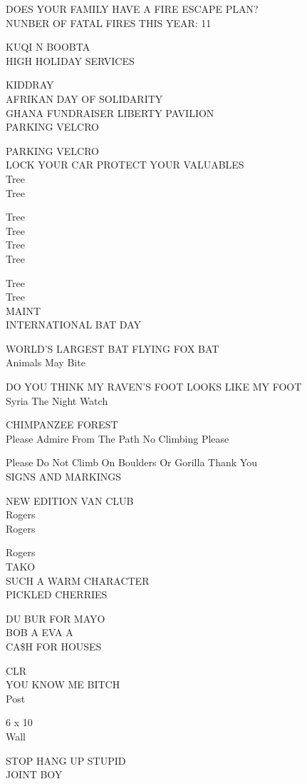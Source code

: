 \documentclass[10pt,letterpaper]{article}
\begin{document}
DOES YOUR FAMILY HAVE A FIRE ESCAPE PLAN?\\
NUNBER OF FATAL FIRES THIS YEAR: 11

KUQI N BOOBTA\\
HIGH HOLIDAY SERVICES

KIDDRAY\\
AFRIKAN DAY OF SOLIDARITY\\
GHANA FUNDRAISER LIBERTY PAVILION\\
PARKING VELCRO

PARKING VELCRO\\
LOCK YOUR CAR PROTECT YOUR VALUABLES\\
Tree\\
Tree

Tree\\
Tree\\
Tree\\
Tree

Tree\\
Tree\\
MAINT\\
INTERNATIONAL BAT DAY

WORLD'S LARGEST BAT FLYING FOX BAT\\
Animals May Bite

DO YOU THINK MY RAVEN'S FOOT LOOKS LIKE MY FOOT\\
Syria The Night Watch

CHIMPANZEE FOREST\\
Please Admire From The Path No Climbing Please

Please Do Not Climb On Boulders Or Gorilla Thank You\\
SIGNS AND MARKINGS

NEW EDITION VAN CLUB\\
Rogers\\
Rogers

Rogers\\
TAKO\\
SUCH A WARM CHARACTER\\
PICKLED CHERRIES

DU BUR FOR MAYO\\
BOB A EVA A\\
CA\$H FOR HOUSES

CLR\\
YOU KNOW ME BITCH\\
Post

6 x 10\\
Wall

STOP HANG UP STUPID\\
JOINT BOY
\end{document}
